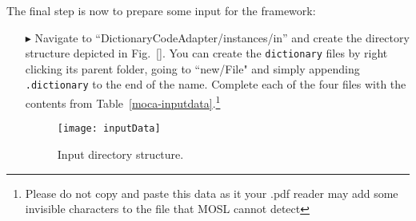 The final step is now to prepare some input for the framework:
\begin{enumerate}

\item[$\blacktriangleright$] Navigate to ``DictionaryCodeAdapter/instances/in'' and create the directory structure depicted in Fig.~\ref{}. You can create
the \texttt{dictionary} files by right clicking its parent folder, going to ``new/File" and simply appending \texttt{.dictionary} to the end of the name.
Complete each of the four files with the contents from Table~\ref{moca-inputdata}.\footnote{Please do not copy and paste this data as it your .pdf reader may
add some invisible characters to the file that MOSL cannot detect}
 
\begin{figure}[htp]
\begin{center}
  \texttt{[image: inputData]}
  \caption{Input directory structure.}
  \label{fig:moca-inputdata}
\end{center}
\end{figure}

\end{enumerate}


